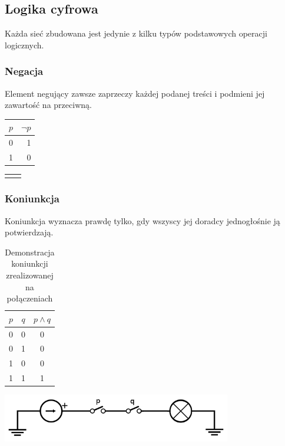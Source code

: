 \documentclass[a4paper,12pt]{article}
\begin{document}
\subsection{Logika cyfrowa}
Każda sieć zbudowana jest jedynie z kilku typów podstawowych operacji logicznych.

\subsubsection{Negacja}
Element negujący zawsze zaprzeczy każdej podanej treści i podmieni jej zawartość na przeciwną.

\begin{table}[h!]
\centering

\begin{minipage}{5.5cm}
\centering

\begin{tabular}{ | c || r | }
  \hline
  $p$ & $\lnot p$ \\ \hline
  0 & 1 \\
  1 & 0 \\
  \hline
\end{tabular}
\end{minipage}
\begin{minipage}{11cm}
\begin{tabular}{  c r }
  & \\
\end{tabular}
\end{minipage}
\end{table}

\subsubsection{Koniunkcja}

Koniunkcja wyznacza prawdę tylko, gdy wszyscy jej doradcy jednogłośnie ją potwierdzają.

\begin{table}[h!]
\centering

\begin{minipage}{5.5cm}
\centering

\begin{tabular}{ | c | c || c | }
  \hline
  $p$ & $q$ & $p \land q$ \\ \hline
  0 & 0 & 0 \\
  0 & 1 & 0 \\
  1 & 0 & 0 \\
  1 & 1 & 1 \\
  \hline
\end{tabular}
\end{minipage}
\begin{minipage}{11cm}
   \includegraphics[width=10cm]{grafika/obwody/circuit-and.png}
   \caption*{Demonstracja koniunkcji zrealizowanej na połączeniach}
\end{minipage}
\end{table}
\end{document}
